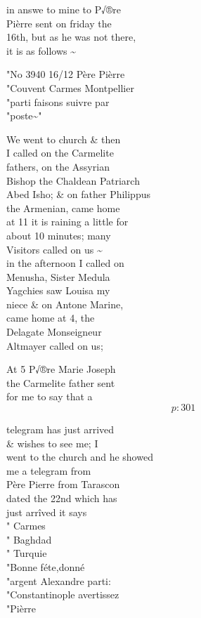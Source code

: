 \documentclass{report}
\begin{document}
	\par{
 	in answe to mine to P√®re\ \\Pièrre sent on friday the\ \\16th, but as he was not there,\ \\it is as follows \~{}\ \\
	}

	\par{
 	"No 3940 16/12 Père Pièrre\ \\"Couvent Carmes Montpellier\ \\"parti faisons suivre par\ \\"poste\~{}"\ \\
	}

	\par{
 	We went to church \& then\ \\I called on the Carmelite\ \\fathers, on the Assyrian\ \\Bishop the Chaldean Patriarch\ \\Abed Isho; \& on father Philippus\ \\the Armenian, came home\ \\at 11 it is raining a little for\ \\about 10 minutes; many\ \\Visitors called on us \~{}\ \\in the afternoon I called on\ \\Menusha, Sister Medula\ \\Yagchies saw Louisa my\ \\niece \& on Antone Marine,\ \\came home at 4, the\ \\Delagate Monseigneur\ \\Altmayer called on us;\ \\
	}

	\par{
 	At 5 P√®re Marie Joseph\ \\the Carmelite father sent\ \\for me to say that a\ \\
  \[p: 301 \]

	}


	\par{
 	telegram has just arrived\ \\\& wishes to see me; I\ \\went to the church and he showed\ \\me a telegram from\ \\Père Pierre from Tarascon\ \\dated the 22nd which has\ \\just arrîved it says\ \\" Carmes\ \\" Baghdad\ \\" Turquie\ \\"Bonne féte,donné\ \\"argent Alexandre parti:\ \\"Constantinople avertissez\ \\"Pièrre\ \\
	}
\end{document}
